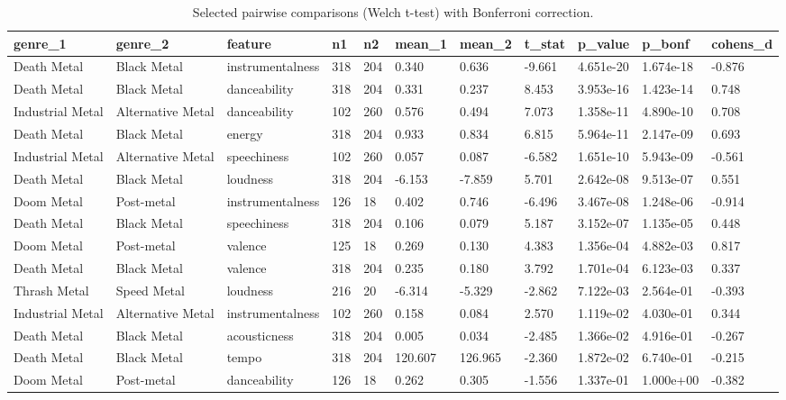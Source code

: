 \begin{table}[t]
\centering
\caption{Selected pairwise comparisons (Welch t-test) with Bonferroni correction.}
\label{tab:posthoc\_pairs}
\begin{tabular}{|l|l|l|l|l|l|l|l|l|l|l|}
\hline
genre\_1 & genre\_2 & feature & n1 & n2 & mean\_1 & mean\_2 & t\_stat & p\_value & p\_bonf & cohens\_d \\ \hline
Death Metal & Black Metal & instrumentalness & 318 & 204 & 0.340 & 0.636 & -9.661 & 4.651e-20 & 1.674e-18 & -0.876 \\
Death Metal & Black Metal & danceability & 318 & 204 & 0.331 & 0.237 & 8.453 & 3.953e-16 & 1.423e-14 & 0.748 \\
Industrial Metal & Alternative Metal & danceability & 102 & 260 & 0.576 & 0.494 & 7.073 & 1.358e-11 & 4.890e-10 & 0.708 \\
Death Metal & Black Metal & energy & 318 & 204 & 0.933 & 0.834 & 6.815 & 5.964e-11 & 2.147e-09 & 0.693 \\
Industrial Metal & Alternative Metal & speechiness & 102 & 260 & 0.057 & 0.087 & -6.582 & 1.651e-10 & 5.943e-09 & -0.561 \\
Death Metal & Black Metal & loudness & 318 & 204 & -6.153 & -7.859 & 5.701 & 2.642e-08 & 9.513e-07 & 0.551 \\
Doom Metal & Post-metal & instrumentalness & 126 & 18 & 0.402 & 0.746 & -6.496 & 3.467e-08 & 1.248e-06 & -0.914 \\
Death Metal & Black Metal & speechiness & 318 & 204 & 0.106 & 0.079 & 5.187 & 3.152e-07 & 1.135e-05 & 0.448 \\
Doom Metal & Post-metal & valence & 125 & 18 & 0.269 & 0.130 & 4.383 & 1.356e-04 & 4.882e-03 & 0.817 \\
Death Metal & Black Metal & valence & 318 & 204 & 0.235 & 0.180 & 3.792 & 1.701e-04 & 6.123e-03 & 0.337 \\
Thrash Metal & Speed Metal & loudness & 216 & 20 & -6.314 & -5.329 & -2.862 & 7.122e-03 & 2.564e-01 & -0.393 \\
Industrial Metal & Alternative Metal & instrumentalness & 102 & 260 & 0.158 & 0.084 & 2.570 & 1.119e-02 & 4.030e-01 & 0.344 \\
Death Metal & Black Metal & acousticness & 318 & 204 & 0.005 & 0.034 & -2.485 & 1.366e-02 & 4.916e-01 & -0.267 \\
Death Metal & Black Metal & tempo & 318 & 204 & 120.607 & 126.965 & -2.360 & 1.872e-02 & 6.740e-01 & -0.215 \\
Doom Metal & Post-metal & danceability & 126 & 18 & 0.262 & 0.305 & -1.556 & 1.337e-01 & 1.000e+00 & -0.382 \\
\hline
\end{tabular}
\end{table}